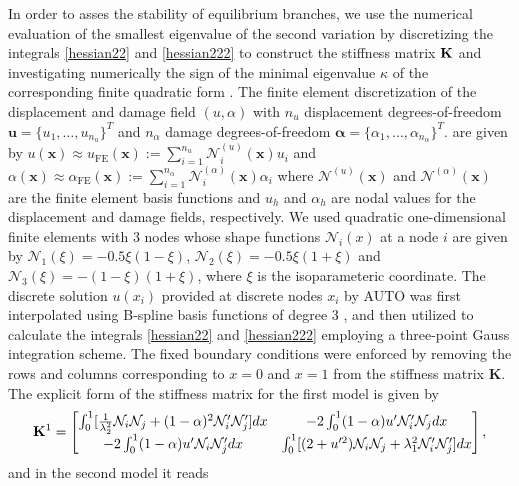 In order to asses the stability of equilibrium branches, we use  the numerical evaluation of the smallest eigenvalue of the second variation by discretizing the integrals \eqref{hessian22} and   \eqref{hessian222} to construct the stiffness matrix
${\bf K}$ and investigating numerically the sign of the minimal eigenvalue $\kappa$ of the corresponding finite quadratic form \cite{Sanderson2016-ht}.  The finite element discretization of the displacement and damage field $(u, \alpha )$     with \( n_u \) displacement degrees-of-freedom 
$
\mathbf{u} = \{ u_1, \ldots, u_{n_u} \}^T 
$
and \( n_\alpha \) damage degrees-of-freedom 
$
\boldsymbol{\alpha} = \{ \alpha_1, \ldots, \alpha_{n_\alpha} \}^T.
$ are given by 
$
u(\mathbf{x}) \approx u_{\text{FE}} (\mathbf{x}) := \sum_{i=1}^{n_u} \mathcal{N}^{(u)}_i(\mathbf{x}) u_i $
and $\alpha(\mathbf{x}) \approx \alpha_{\text{FE}} (\mathbf{x}) := \sum_{i=1}^{n_\alpha} \mathcal{N}^{(\alpha)}_i (\mathbf{x}) \alpha_i 
$
where $\mathcal{N}^{(u)}(\mathbf{x}) $ and $\mathcal{N}^{(\alpha)}(\mathbf{x}) $ are the finite element basis functions and  $u_h$ and  $\alpha_h$ are nodal values for the displacement and damage fields, respectively. We used quadratic one-dimensional finite elements with 3 nodes  whose   shape functions   ${\mathcal N}_i(x)$ at a node $i$  are given by ${\mathcal N}_1(\xi)=-0.5\xi(1-\xi)$, ${\mathcal N}_2(\xi)=-0.5\xi(1+\xi)$ and ${\mathcal N}_3(\xi)=-(1-\xi)(1+\xi)$, where $\xi$ is the isoparameteric coordinate. The discrete solution $u(x_i)$ provided at discrete nodes $x_i$ by AUTO was first interpolated using B-spline basis functions of degree 3 \cite{Grimstad2016-cq}, and then utilized to calculate the integrals \eqref{hessian22} and   \ref{hessian222} employing a three-point Gauss integration scheme. The fixed boundary conditions were enforced by removing the rows and columns corresponding to $x = 0$ and $x = 1$ from the stiffness  matrix $\mathbf{K}$. The explicit form of the stiffness matrix for the first model is given by  
\begin{equation}
{\bf K}^1=\begin{bmatrix}
\int_0^1[ \frac{1}{\lambda_2^2}{\mathcal N}_i{\mathcal N}_j + (1-\alpha)^2{\mathcal N}'_i{\mathcal N}'_j
] dx&
-2\int_0^1(1-\alpha)u' {\mathcal N}'_i {\mathcal N}_j  dx\\
-2\int_0^1(1-\alpha)u' {\mathcal N}_i {\mathcal N}'_j dx
& \int_0^1 [ (2+u'^2){\mathcal N}_i{\mathcal N}_j +\lambda_1^2{\mathcal N}'_i{\mathcal N}'_j] dx
\end{bmatrix},
\label{eq:stifness1}
\end{equation}
and in the second model it reads

